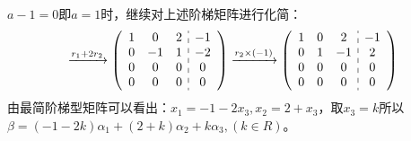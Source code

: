 \documentclass[a4paper]{report}
\begin{document}
\begin{jie}
$a-1=0$即$a=1$时，继续对上述阶梯矩阵进行化简：\begin{equation*}
\xrightarrow{\substack{r_{1}+2 r_{2}}}
{
\left(
 \begin{array}{c:c}
\begin{matrix}
1 & 0 & 2\\
0 & -1 & 1 \\
0 & 0 & 0\\
0 & 0 & 0
\end{matrix}&
\begin{matrix}
-1 \\
-2  \\
0\\
0
\end{matrix}
\end{array}
\right)
}\xrightarrow{\substack{r_{2}\times(-1)}}
{
\left(
 \begin{array}{c:c}
\begin{matrix}
1 & 0 & 2\\
0 & 1 & -1 \\
0 & 0 & 0\\
0 & 0 & 0
\end{matrix}&
\begin{matrix}
-1 \\
2  \\
0\\
0
\end{matrix}
\end{array}
\right)
}
\end{equation*}
由最简阶梯型矩阵可以看出：$x_1=-1-2x_3,x_2=2+x_3$，取$x_3=k$所以$\beta=(-1-2k)\alpha_{1}+(2+k)\alpha_{2}+k\alpha_3,(k\in R)$。


\end{jie}
\end{document}
